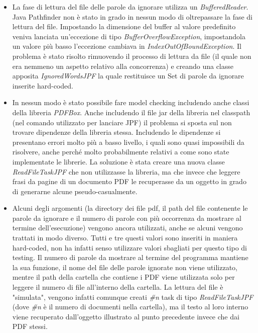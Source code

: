 \begin{itemize}
    \item La fase di lettura del file delle parole da ignorare utilizza un \textit{BufferedReader}. Java Pathfinder non è stato in grado in nessun modo di oltrepassare la fase di lettura del file. Impostando la dimensione del buffer al valore predefinito veniva lanciata un'eccezione di tipo \textit{BufferOverflowException}, impostandola un valore più basso l'eccezione cambiava in \textit{IndexOutOfBoundException}. Il problema è stato risolto rimuovendo il processo di lettura da file (il quale non era nemmeno un aspetto relativo alla concorrenza) e creando una classe apposita \textit{IgnoredWordsJPF} la quale restituisce un Set di parole da ignorare inserite hard-coded.
    \item In nessun modo è stato possibile fare model checking includendo anche classi della libreria \textit{PDFBox}.\newline
    Anche includendo il file jar della libreria nel classpath (nel comando utilizzato per lanciare JPF) il problema si sposta sul non trovare dipendenze della libreria stessa. Includendo le dipendenze si presentano errori molto più a basso livello, i quali sono quasi impossibili da risolvere, anche perché molto probabilmente relativi a come sono state implementate le librerie.\newline
    La soluzione è stata creare una nuova classe \textit{ReadFileTaskJPF} che non utilizzasse la libreria, ma che invece che leggere frasi da pagine di un documento PDF le recuperasse da un oggetto in grado di generarne alcune pseudo-casualmente.
    \item Alcuni degli argomenti (la directory dei file pdf, il path del file contenente le parole da ignorare e il numero di parole con più occorrenza da mostrare al termine dell'esecuzione) vengono ancora utilizzati, anche se alcuni vengono trattati in modo diverso. Tutti e tre questi valori sono inseriti in maniera hard-coded, non ha infatti senso utilizzare valori sbagliati per questo tipo di testing. Il numero di parole da mostrare al termine del programma mantiene la sua funzione, il nome del file delle parole ignorate non viene utilizzato, mentre il path della cartella che contiene i PDF viene utilizzata solo per leggere il numero di file all'interno della cartella. La lettura del file è "simulata", vengono infatti comunque creati \textit{\#n} task di tipo \textit{ReadFileTaskJPF} (dove \textit{\#n} è il numero di documenti nella cartella), ma il testo al loro interno viene recuperato dall'oggetto illustrato al punto precedente invece che dai PDF stessi.
\end{itemize}


